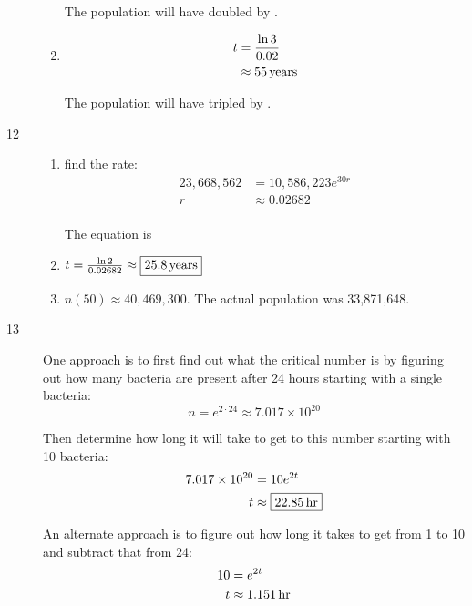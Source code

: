 \documentclass{exam}
\begin{document}
\begin{description}
\begin{enumerate}[a]
            The population will have doubled by .

          \item 
            \begin{align*}
              t & = \frac{\ln 3}{0.02} \\
                & \approx \unit[55]{years} \\
            \end{align*}

            The population will have tripled by .
        \end{enumerate}

      \item[12] 
        \begin{enumerate}[a]
          \item 
            find the rate:
            \begin{align*}
              23,668,562 & = 10,586,223 e^{30r} \\
              r          & \approx 0.02682 \\
            \end{align*}

            The equation is 

          \item $t = \frac{\ln 2}{0.02682} \approx \boxed{ \unit[25.8]{years} }$

          \item $n(50) \approx \boxed{40,469,300}$.  The actual population was 33,871,648.
        \end{enumerate}

    \item[13] 
        One approach is to first find out what the critical number is by figuring out how many bacteria are present
        after 24 hours starting with a single bacteria:
        \[
          n = e^{2 \cdot 24} \approx 7.017 \times 10^{20}
        \]
        
        Then determine how long it will take to get to this number starting with 10 bacteria:
        \begin{align*}
          7.017 \times 10^{20} & = 10 e^{2t} \\
          t                    & \approx \boxed{\unit[22.85]{hr}} \\
        \end{align*}

        An alternate approach is to figure out how long it takes to get from 1 to 10 and subtract that from 24:
        \begin{align*}
          10 & = e^{2t} \\
          t  & \approx \unit[1.151]{hr} \\
        \end{align*}


\end{description}
\end{document}
